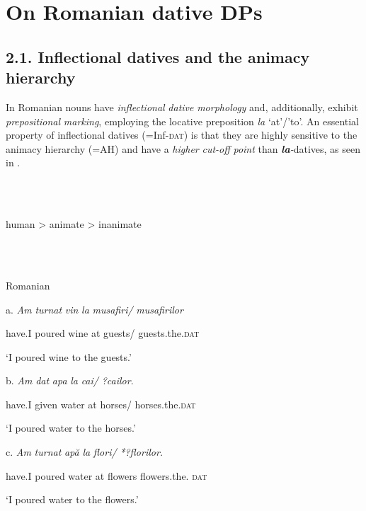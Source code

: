 \documentclass[output=paper,colorlinks,citecolor=brown]{./langscibook}
\begin{document}
\section{On Romanian dative DPs} %

\subsection{\textbf{2.1.} \textbf{Inflectional} \textbf{datives} \textbf{and} \textbf{the} \textbf{animacy} \textbf{hierarchy}}

In Romanian nouns have \textit{inflectional} \textit{dative} \textit{morphology} and, additionally, exhibit \textit{prepositional} \textit{marking}, employing the locative preposition \textit{la} ‘at’/’to’. An essential property of inflectional datives (=Inf-\textsc{dat}) is that they are highly sensitive to the animacy hierarchy (=AH) and have a \textit{higher} \textit{cut-off} \textit{point} than \textbf{\textit{la}}\textit{{}-}datives, as seen in . 

\ea%
    \label{ex:key:7}
    \gll\\
        \\
    \glt
    \z

          human  >  animate    > inanimate

\ea%
    \label{ex:key:8}
    \gll\\
        \\
    \glt
    \z

          Romanian

  a.  \textit{Am}   \textit{turnat}  \textit{vin}   \textit{la} \textit{musafiri/}   \textit{musafirilor}

    have.I   poured   wine   at guests/   guests.the.\textsc{dat}

    ‘I poured wine to the guests.’

  b.  \textit{Am} \textit{dat}    \textit{apa}  \textit{la} \textit{cai/}     \textit{?cailor}.

    have.I given   water   at horses/  horses.the.\textsc{dat} 

    ‘I poured water to the horses.’

  c.  \textit{Am} \textit{turnat}  \textit{apă}  \textit{la} \textit{flori/}   \textit{*?florilor.}

    have.I poured   water   at flowers   flowers.the. \textsc{dat} 

    ‘I poured water to the flowers.’
\end{document}
